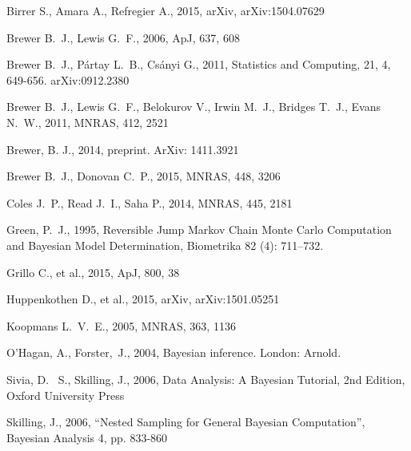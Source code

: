\documentclass[useAMS,usenatbib]{mn2e}
\begin{document}
\begin{thebibliography}{99}
 Birrer S., Amara A., Refregier A., 2015, arXiv, arXiv:1504.07629

 Brewer B.~J., Lewis G.~F., 2006, ApJ, 637, 608

 Brewer B.~J., P{\'a}rtay L.~B., Cs{\'a}nyi G., 2011,
Statistics and Computing, 21, 4, 649-656. arXiv:0912.2380

Brewer B.~J., Lewis G.~F., Belokurov V., Irwin M.~J., Bridges T.~J., Evans 
N.~W., 2011, MNRAS, 412, 2521

 Brewer, B. J., 2014,
preprint. ArXiv: 1411.3921

 Brewer B.~J., Donovan C.~P., 2015, MNRAS, 448, 3206 

 Coles J.~P., Read J.~I., Saha P., 2014, MNRAS, 445, 2181

Green, P.~J., 1995, Reversible Jump Markov Chain Monte Carlo Computation and Bayesian Model Determination, Biometrika 82 (4): 711–732.

Grillo C., et al., 2015, ApJ, 800, 38 

 Huppenkothen D., et al., 2015, arXiv, 
arXiv:1501.05251 

Koopmans L.~V.~E., 2005, MNRAS, 363, 1136

O'Hagan, A., Forster,~J., 2004, Bayesian inference. London: Arnold.

 Sivia, 
D.~ S., Skilling, J., 2006, Data Analysis: A Bayesian Tutorial, 2nd 
Edition, Oxford University Press

 Skilling, 
J., 2006, ``Nested Sampling for General Bayesian Computation'', Bayesian 
Analysis 4, pp. 833-860


\end{thebibliography}
\end{document}
